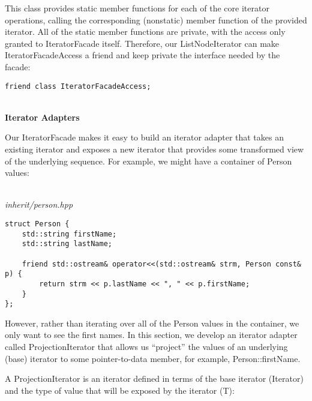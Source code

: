 This class provides static member functions for each of the core iterator operations, calling the corresponding (nonstatic) member function of the provided iterator. All of the static member functions are private, with the access only granted to IteratorFacade itself. Therefore, our ListNodeIterator can make IteratorFacadeAccess a friend and keep private the interface needed by the facade:

\begin{lstlisting}[style=styleCXX]
friend class IteratorFacadeAccess;
\end{lstlisting}

\hspace*{\fill} \\ %
\noindent
\textbf{Iterator Adapters}

Our IteratorFacade makes it easy to build an iterator adapter that takes an existing iterator and exposes a new iterator that provides some transformed view of the underlying sequence. For example, we might have a container of Person values:

\hspace*{\fill} \\ %
\noindent
\textit{inherit/person.hpp}
\begin{lstlisting}[style=styleCXX]
struct Person {
	std::string firstName;
	std::string lastName;
	
	friend std::ostream& operator<<(std::ostream& strm, Person const& p) {
		return strm << p.lastName << ", " << p.firstName;
	}
};
\end{lstlisting}

However, rather than iterating over all of the Person values in the container, we only want to see the first names. In this section, we develop an iterator adapter called ProjectionIterator that allows us “project” the values of an underlying (base) iterator to some pointer-to-data member, for example, Person::firstName.

A ProjectionIterator is an iterator defined in terms of the base iterator (Iterator) and the type of value that will be exposed by the iterator (T):

